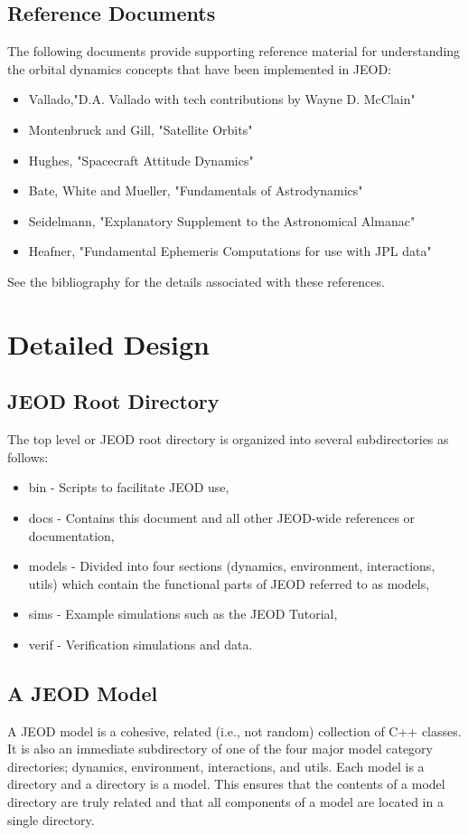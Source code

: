\newpage\subsection{Reference Documents}
The following documents provide supporting reference material for understanding the orbital dynamics concepts that have been implemented in JEOD:
\begin{itemize}
\item Vallado,"D.A. Vallado with tech contributions by Wayne D. McClain" \cite{VMcC}
\item Montenbruck and Gill, "Satellite Orbits" \cite{MG}
\item Hughes,  "Spacecraft Attitude Dynamics" \cite{Hughes}
\item Bate, White and Mueller, "Fundamentals of Astrodynamics" \cite{BMW}
\item Seidelmann, "Explanatory Supplement to the Astronomical Almanac" \cite{Seidelmann}
\item Heafner, "Fundamental Ephemeris Computations for use with JPL data" \cite{Heafner}
\end{itemize}

See the bibliography for the details associated with these references.

\section{Detailed Design}
\subsection{JEOD Root Directory}
The top level or JEOD root directory is organized into several subdirectories as follows:
\begin{itemize}
\item bin - Scripts to facilitate JEOD use,
\item docs - Contains this document and all other JEOD-wide references or documentation,
\item models - Divided into four sections (dynamics, environment, interactions, utils) which contain the functional parts of JEOD referred to as models,
\item sims - Example simulations such as the JEOD Tutorial,
\item verif - Verification simulations and data.
\end{itemize}

\subsection{A JEOD Model}\label{desc:modeldesc}
A JEOD model is a cohesive, related (i.e., not random) collection of C++ classes.  It is also an immediate subdirectory of one of the four major model category directories; dynamics, environment, interactions, and utils.  Each model is a directory and a directory is a model.  This ensures that the contents of a model directory are truly related and that all components of a model are located in a single directory.

